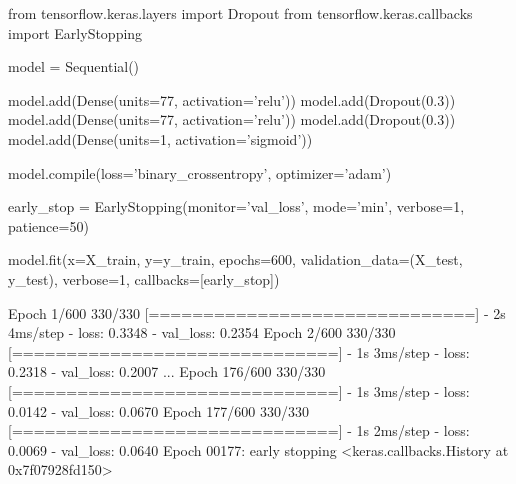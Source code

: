 \begin{ipythonnon}
from tensorflow.keras.layers import Dropout
from tensorflow.keras.callbacks import EarlyStopping
	
model = Sequential()
	
model.add(Dense(units=77, activation='relu'))
model.add(Dropout(0.3))
model.add(Dense(units=77, activation='relu'))
model.add(Dropout(0.3))
model.add(Dense(units=1, activation='sigmoid'))
	
model.compile(loss='binary_crossentropy', optimizer='adam')
	
early_stop = EarlyStopping(monitor='val_loss', 
                           mode='min', 
                           verbose=1, 
                           patience=50)
	
model.fit(x=X_train, y=y_train,
          epochs=600,
          validation_data=(X_test, y_test), 
          verbose=1, callbacks=[early_stop])
\end{ipythonnon}
\begin{ioutput}
Epoch 1/600
330/330 [==============================] - 2s 4ms/step - loss: 0.3348 
- val_loss: 0.2354
Epoch 2/600
330/330 [==============================] - 1s 3ms/step - loss: 0.2318 
- val_loss: 0.2007
...
Epoch 176/600
330/330 [==============================] - 1s 3ms/step - loss: 0.0142 
- val_loss: 0.0670
Epoch 177/600
330/330 [==============================] - 1s 2ms/step - loss: 0.0069 
- val_loss: 0.0640
Epoch 00177: early stopping
<keras.callbacks.History at 0x7f07928fd150>
\end{ioutput}


